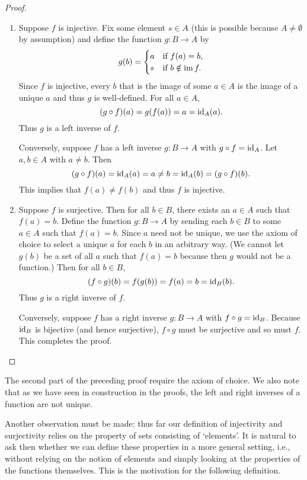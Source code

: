 \begin{proof}\(\)

    \begin{enumerate}[label=(\alph*), wide]
        \item Suppose \(f\) is injective. Fix some element \(s \in A\) (this is
        possible because \(A \neq \emptyset\) by assumption) and define the
        function \(g : B \to A\) by
        \[
            g(b) = \begin{cases}
                a & \text{if } f(a) = b, \\
                s & \text{if } b \notin \operatorname{im} f.
            \end{cases}
        \]
        Since \(f\) is injective, every \(b\) that is the image of some \(a \in
        A\) is the image of a unique \(a\) and thus \(g\) is well-defined. For
        all \(a \in A\),
        \[
            (g \circ f)(a) = g(f(a)) = a = \operatorname{id}_A(a).
        \]
        Thus \(g\) is a left inverse of \(f\).

        Conversely, suppose \(f\) has a left inverse \(g : B \to A\) with \(g
        \circ f = \operatorname{id}_A\). Let \(a, b \in A\) with \(a \neq b\). Then
        \[
            (g \circ f)(a) = \operatorname{id}_A(a) = a \neq b = \operatorname{id}_A(b) = (g \circ f)(b).
        \]
        This implies that \(f(a) \neq f(b)\) and thus \(f\) is injective.

        \item Suppose \(f\) is surjective. Then for all \(b \in B\), there
        exists an \(a \in A\) such that \(f(a) = b\). Define the function \(g :
        B \to A\) by sending each \(b \in B\) to some \(a \in A\) such that
        \(f(a) = b\). Since \(a\) need not be unique, we use the axiom of choice
        to select a unique \(a\) for each \(b\) in an arbitrary way. (We cannot
        let \(g(b)\) be a set of all \(a\) such that \(f(a) = b\) because then
        \(g\) would not be a function.) Then for all \(b \in B\),
        \[
            (f \circ g)(b) = f(g(b)) = f(a) = b = \operatorname{id}_B(b).
        \]
        Thus \(g\) is a right inverse of \(f\).

        Conversely, suppose \(f\) has a right inverse \(g : B \to A\) with \(f
        \circ g = \operatorname{id}_B\). Because \(\operatorname{id}_B\) is bijective (and hence
        surjective), \(f \circ g\) must be surjective and so must \(f\). This
        completes the proof.
    \end{enumerate}
\end{proof}

\begin{remark}
    The second part of the preceding proof require the axiom of choice. We also
    note that as we have seen in construction in the proofs, the left and right
    inverses of a function are not unique.

    Another observation must be made: thus far our definition of injectivity and surjectivity relies on the property of sets consisting of `elements'. It is natural to ask then whether we can define these properties in a more general setting, i.e., without relying on the notion of elements and simply looking at the properties of the functions themselves. This is the motivation for the following definition.
\end{remark}

